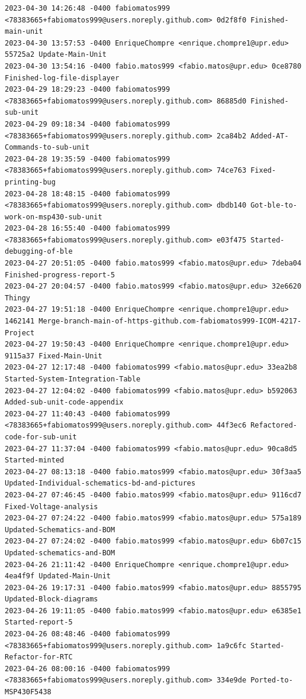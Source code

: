 \documentclass[12pt]{article}
\begin{document}
\begin{lstlisting}
2023-04-30 14:26:48 -0400 fabiomatos999 <78383665+fabiomatos999@users.noreply.github.com> 0d2f8f0 Finished-main-unit
2023-04-30 13:57:53 -0400 EnriqueChompre <enrique.chompre1@upr.edu> 55725a2 Update-Main-Unit
2023-04-30 13:54:16 -0400 fabio.matos999 <fabio.matos@upr.edu> 0ce8780 Finished-log-file-displayer
2023-04-29 18:29:23 -0400 fabiomatos999 <78383665+fabiomatos999@users.noreply.github.com> 86885d0 Finished-sub-unit
2023-04-29 09:18:34 -0400 fabiomatos999 <78383665+fabiomatos999@users.noreply.github.com> 2ca84b2 Added-AT-Commands-to-sub-unit
2023-04-28 19:35:59 -0400 fabiomatos999 <78383665+fabiomatos999@users.noreply.github.com> 74ce763 Fixed-printing-bug
2023-04-28 18:48:15 -0400 fabiomatos999 <78383665+fabiomatos999@users.noreply.github.com> dbdb140 Got-ble-to-work-on-msp430-sub-unit
2023-04-28 16:55:40 -0400 fabiomatos999 <78383665+fabiomatos999@users.noreply.github.com> e03f475 Started-debugging-of-ble
2023-04-27 20:51:05 -0400 fabio.matos999 <fabio.matos@upr.edu> 7deba04 Finished-progress-report-5
2023-04-27 20:04:57 -0400 fabio.matos999 <fabio.matos@upr.edu> 32e6620 Thingy
2023-04-27 19:51:18 -0400 EnriqueChompre <enrique.chompre1@upr.edu> 1462141 Merge-branch-main-of-https-github.com-fabiomatos999-ICOM-4217-Project
2023-04-27 19:50:43 -0400 EnriqueChompre <enrique.chompre1@upr.edu> 9115a37 Fixed-Main-Unit
2023-04-27 12:17:48 -0400 fabiomatos999 <fabio.matos@upr.edu> 33ea2b8 Started-System-Integration-Table
2023-04-27 12:04:02 -0400 fabiomatos999 <fabio.matos@upr.edu> b592063 Added-sub-unit-code-appendix
2023-04-27 11:40:43 -0400 fabiomatos999 <78383665+fabiomatos999@users.noreply.github.com> 44f3ec6 Refactored-code-for-sub-unit
2023-04-27 11:37:04 -0400 fabiomatos999 <fabio.matos@upr.edu> 90ca8d5 Started-minted
2023-04-27 08:13:18 -0400 fabio.matos999 <fabio.matos@upr.edu> 30f3aa5 Updated-Individual-schematics-bd-and-pictures
2023-04-27 07:46:45 -0400 fabio.matos999 <fabio.matos@upr.edu> 9116cd7 Fixed-Voltage-analysis
2023-04-27 07:24:22 -0400 fabio.matos999 <fabio.matos@upr.edu> 575a189 Updated-Schematics-and-BOM
2023-04-27 07:24:02 -0400 fabio.matos999 <fabio.matos@upr.edu> 6b07c15 Updated-schematics-and-BOM
2023-04-26 21:11:42 -0400 EnriqueChompre <enrique.chompre1@upr.edu> 4ea4f9f Updated-Main-Unit
2023-04-26 19:17:31 -0400 fabio.matos999 <fabio.matos@upr.edu> 8855795 Updated-Block-diagrams
2023-04-26 19:11:05 -0400 fabio.matos999 <fabio.matos@upr.edu> e6385e1 Started-report-5
2023-04-26 08:48:46 -0400 fabiomatos999 <78383665+fabiomatos999@users.noreply.github.com> 1a9c6fc Started-Refactor-for-RTC
2023-04-26 08:00:16 -0400 fabiomatos999 <78383665+fabiomatos999@users.noreply.github.com> 334e9de Ported-to-MSP430F5438

\end{lstlisting}
\end{document}
